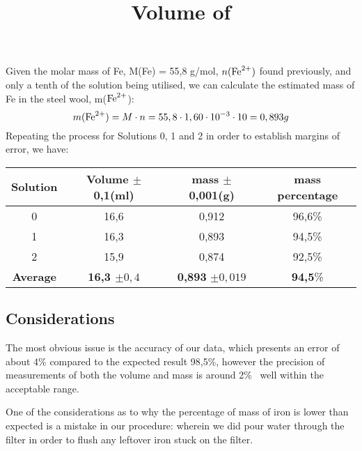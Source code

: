 \documentclass[12pt, a4paper]{article}
\begin{document}
Given the molar mass of Fe, M(Fe) = 55,8 g/mol, $n(\ce{Fe}^{2+})$ found previously, and only a tenth of the solution being utilised, we can calculate the estimated mass of Fe in the steel wool, m($\ce{Fe}^{2+}$):
\begin{equation}
	m(\ce{Fe}^{2+}) = M\cdot n = 55,8 \cdot 1,60 \cdot 10^{-3} \cdot 10 = 0,893 g
\end{equation}
Repeating the process for Solutions 0, 1 and 2 in order to establish margins of error, we have:

\begin{center}\title{Volume of }
\begin{tabular}{|c|c|c|c|}
	\hline
	Solution & Volume \ce{KMnO4} $\pm$ 0,1(ml) & \ce{Fe} mass $\pm$ 0,001(g) & \ce{Fe} mass percentage\\
	\hline
	0 & 16,6 & 0,912 & 96,6\% \\
	1 & 16,3 & 0,893 & 94,5\% \\
	2 & 15,9 & 0,874 & 92,5\% \\
	\hline 
	\textbf{Average} & \textbf{16,3 $\pm 0,4$} & \textbf{0,893} $\pm 0,019 $ & \textbf{94,5}\% \\
	\hline
	\end{tabular}
	\end{center}

\subsection*{Considerations}
The most obvious issue is the accuracy of our data, which presents an error of about 4\% compared to the expected result 98,5\%, however the precision of measurements of both the volume and mass is around 2\% \textendash\ well within the acceptable range.\par
One of the considerations as to why the percentage of mass of iron is lower than expected is a mistake in our procedure: wherein we did pour water through the filter in order to flush any leftover iron stuck on the filter.
\end{document}
